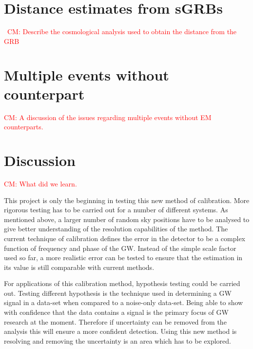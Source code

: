 \documentclass[10pt]{iopart}
\newcommand{\cm}[1]{\textcolor{red}{CM: #1}}
\begin{document}
\section{Distance estimates from \acp{sGRB}\label{sec:cosmo}}

~\cm{Describe the cosmological analysis used to obtain the distance from the
GRB}

\section{Multiple events without counterpart\label{sec:multiple}}

\cm{A discussion of the issues regarding multiple events
without EM counterparts.}

\section{Discussion\label{sec:discussion}}

\cm{What did we learn.}

This project is only the beginning in testing this new method of calibration.
More rigorous testing has to be carried out for a number of different systems.
As mentioned above, a larger number of random sky positions have to be analysed
to give better understanding of the resolution capabilities of the method. The
current technique of calibration defines the error in the detector to be a
complex function of frequency and phase of the GW. Instead of the simple scale
factor used so far, a more realistic error can be tested to ensure that the
estimation in its value is still comparable with current methods.


For applications of this calibration method, hypothesis testing could be
carried out. Testing different hypothesis is the technique used in determining
a GW signal in a data-set when compared to a noise-only data-set. Being able to
show with confidence that the data contains a signal is the primary focus of GW
research at the moment. Therefore if uncertainty can be removed from the
analysis this will ensure a more confident detection. Using this new method is
resolving and removing the uncertainty is an area which has to be explored.
\end{document}
